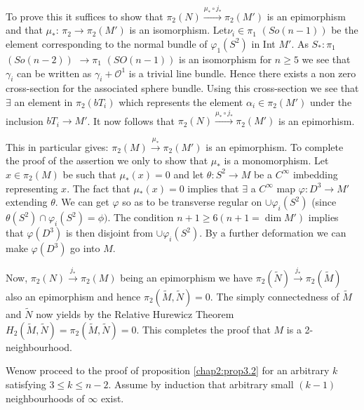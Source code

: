  To prove this it suffices to show that $\pi_2 (N) \xrightarrow{\mu_*
\circ  j_*} \pi_2 (M') $ is an epimorphism and that $ \mu_{*}$: $\pi_2
 \to \pi_2(M')$  is an isomorphism.  Let\pageoriginale $\nu_i \in
 \pi_1$ $(So(n-1))$ be the element corresponding to the normal bundle of
 $\varphi_1 (S^2)$ in Int $M'$. As $S_*: \pi_1$ $(So (n-2))$ $\to
 \pi_1$ $(SO(n-1))$ is an isomorphism for $ n \geq 5$ we see that
 $\gamma_i$ can be written as $\gamma_i + \mathscr{O}^1$ is a trivial
 line bundle. Hence there exists a non zero cross-section for the
 associated sphere bundle. Using this cross-section we see that
 $\exists$ an element in $\pi_2(bT_i)$ which represents the element
 $\alpha_i \in \pi_2(M')$ under the inclusion $bT_i \to M'$. It
 now follows that $\pi_2 (N)\xrightarrow{\mu_* \circ j_*} \pi_2 (M')$ is an
 epimorhism. 
 
 This in particular gives: $\pi_2 (M) \xrightarrow{\mu_*}\pi_2(M')$ is
 an epimorphism. To complete the proof of the assertion we only to
 show that $\mu_*$ is a monomorphism. Let $x \in \pi_2 (M)$ be
 such that $\mu_*(x) = 0$ and let $ \theta : S^2 \to M$ be a
 $C^{\infty}$ imbedding representing $x$. The fact that $ \mu_* (x) = 0$
 implies that $ \exists$ a $C^{\infty}$ map $\varphi : D^3 \to M'$
 extending $\theta$. We can get $\varphi$ so as to be transverse regular
 on $\cup \varphi_i (S^2)$ (since $ \theta (S^2) \cap \varphi_i (S^2)
 = \phi)$. The condition $n + 1\geq 6 (n+1 = \dim M')$ implies that
 $\varphi(D^3)$ is then disjoint from $\cup \varphi_i (S^2)$. By a
 further deformation we can make $\varphi (D^3)$ go into $M$. 
 
 Now, $\pi _2(N) \xrightarrow {j _*}\pi _2(M)$ being an epimorphism we
 have $\pi_2 (\tilde{N}) \xrightarrow {j_*}\pi_2 (\tilde{M})$ also an
 epimorphism and hence $\pi_2 (\tilde{M}, \tilde{N}) = 0$. The simply
 connectedness of $\tilde{M}$ and $\tilde {N}$ now yields by the
 Relative Hurewicz Theorem  $H_2 (\tilde{M}, \tilde{N}) = \pi_2
 (\tilde{M}, \tilde{N}) = 0$. This completes the proof that $M$ is a
 2-neighbourhood. 
 
 We\pageoriginale now proceed to the proof of proposition \ref{chap2:prop3.2} for an
 arbitrary $k$ satisfying $3 \leq k \leq n-2$. Assume by induction
 that arbitrary small $(k-1)$ neighbourhoods of $\infty$ exist.  

